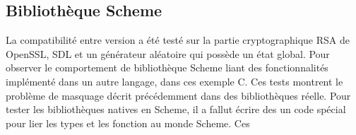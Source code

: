 \documentclass[12pt,initial,twoside,maitrise]{dms}
\numberwithin{equation}{section}
\numberwithin{table}{chapter}
\numberwithin{figure}{chapter}
\begin{document}
%
%
%
%



\clearpage
\subsection{Bibliothèque Scheme}
La compatibilité entre version a été testé sur la partie cryptographique
RSA de OpenSSL, SDL et un générateur aléatoire qui possède un état global.
Pour observer le comportement de bibliothèque Scheme liant des fonctionnalités
implémenté dans un autre langage, dans ces exemple C. Ces tests montrent le problème
de masquage décrit précédemment dans des bibliothèques réelle.
Pour tester les bibliothèques natives en Scheme, il a fallut écrire des
un code spécial pour lier les types et les fonction au monde Scheme. Ces
\end{document}
